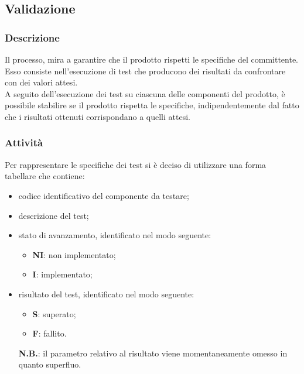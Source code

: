 		\subsection{Validazione}
		\subsubsection{Descrizione}
		Il processo, mira a garantire che il prodotto rispetti le specifiche del committente. Esso consiste nell'esecuzione di test che producono dei risultati da confrontare con dei valori attesi.
		\\
		A seguito dell'esecuzione dei test su ciascuna delle componenti del prodotto, è possibile stabilire se il prodotto rispetta le specifiche, indipendentemente dal fatto che i risultati ottenuti corrispondano a quelli attesi.
	
		\subsubsection{Attività}
		Per rappresentare le specifiche dei test si è deciso di utilizzare una forma tabellare che contiene:
				\begin{itemize}
					\item codice identificativo del componente da testare;
					\item descrizione del test;
					\item stato di avanzamento, identificato nel modo seguente:
						\begin{itemize}
							\item \textbf{NI}: non implementato;
							\item \textbf{I}: implementato;
						\end{itemize}
					\item risultato del test, identificato nel modo seguente:
						\begin{itemize}
							\item \textbf{S}: superato;
							\item \textbf{F}: fallito.
						\end{itemize}
						\textbf{N.B.}: il parametro relativo al risultato viene momentaneamente omesso in quanto superfluo.						 
				\end{itemize}		
		
